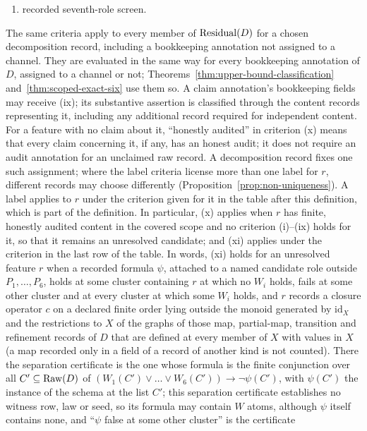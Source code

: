 \begin{definition}
\begin{enumerate}[label=(\roman*),topsep=2pt,itemsep=1pt]
  \item recorded seventh-role screen.
\end{enumerate}
The same criteria apply to every member of \(\operatorname{Residual}\!\left(D\right)\) for a chosen
decomposition record, including a bookkeeping annotation not assigned to a
channel. They are evaluated in the same way for every bookkeeping annotation of \(D\), assigned to a channel or not; Theorems~\ref{thm:upper-bound-classification} and~\ref{thm:scoped-exact-six} use them so. A claim annotation's bookkeeping fields may receive (ix); its substantive
assertion is classified through the content records representing it,
including any additional record required for independent content. For a feature with no claim about it, ``honestly audited'' in
criterion (x) means that every claim concerning it, if any, has an honest
audit; it does not require an audit annotation for an unclaimed raw record.
A decomposition record fixes one such assignment; where the label criteria
license more than one label for \(r\), different records may choose
differently (Proposition~\ref{prop:non-uniqueness}). A label applies to \(r\) under the criterion given for it in the table
after this definition, which is part of the definition. In particular,
(x) applies when \(r\) has finite, honestly audited content in the covered scope and
no criterion (i)--(ix) holds for it, so that it remains an unresolved
candidate; and (xi) applies under the criterion in the last row of the table. In words, (xi)
holds for an unresolved feature \(r\) when a recorded formula \(\psi\), attached
to a named candidate role outside \(P_1,\dots,P_6\), holds at some cluster
containing \(r\) at which no \(W_i\) holds, fails at some other cluster and at
every cluster at which some \(W_i\) holds, and \(r\) records a closure operator \(c\) on
a declared finite order lying outside the monoid generated by \(\mathrm{id}_X\) and the restrictions to \(X\) of the graphs of those map, partial-map, transition and refinement records of
\(D\) that are defined at every member of \(X\) with values in \(X\) (a map recorded only in a field of a record of another kind is not counted). There the
separation certificate is the one whose formula is the finite conjunction over
all \(C'\subseteq\operatorname{Raw}\!\left(D\right)\) of
\((W_1(C')\vee\dots\vee W_6(C'))\rightarrow\neg\psi(C')\), with \(\psi(C')\) the
instance of the schema at the list \(C'\); this separation certificate
establishes no witness row, law or seed, so its formula may contain \(W\)
atoms, although \(\psi\) itself contains none, and ``\(\psi\) false at some other cluster'' is the certificate

\end{definition}

